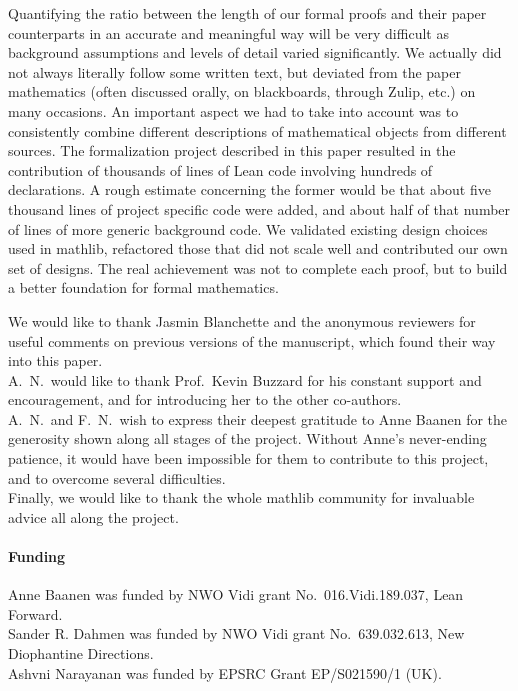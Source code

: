 \documentclass[sn-mathphys]{sn-jnl}%
\newcommand{\mathlib}{\textsf{mathlib}\xspace}
\begin{document}
Quantifying the ratio between the length of our formal proofs and their paper counterparts in an accurate and meaningful way will be very difficult as background assumptions and levels of detail varied significantly. We actually did not always literally follow some written text, but deviated from the paper mathematics (often discussed orally, on blackboards, through Zulip, etc.) on many occasions. An important aspect we had to take into account was to consistently combine different descriptions of mathematical objects from different sources.
The formalization project described in this paper resulted in the contribution of thousands of lines of Lean code involving hundreds of declarations.
A rough estimate concerning the former would be that about five thousand lines of project specific code were added, and about half of that number of lines of more generic background code.
We validated existing design choices used in \mathlib, refactored those that did not scale well
and contributed our own set of designs.
The real achievement was not to complete each proof,
but to build a better foundation for formal mathematics.

\backmatter

We would like to thank Jasmin Blanchette and the anonymous reviewers for useful comments on previous versions of the manuscript, which found their way into this paper.\\
A.~N.~would like to thank Prof.\ Kevin Buzzard for his constant support and encouragement, and for introducing her to the other co-authors.\\
A.~N.~and F.~N.~wish to express their deepest gratitude to Anne Baanen for the generosity shown along all stages of the project. Without Anne's never-ending patience, it would have been impossible for them to contribute to this project, and to overcome several difficulties.\\
Finally, we would like to thank the whole \mathlib community for invaluable advice all along the project.


\paragraph{Funding}
Anne Baanen was funded by NWO Vidi grant No.\ 016.Vidi.189.037, Lean Forward.\\
Sander R. Dahmen was funded by NWO Vidi grant No.\ 639.032.613, New Diophantine Directions.\\
Ashvni Narayanan was funded by EPSRC Grant EP/S021590/1 (UK).
\end{document}
